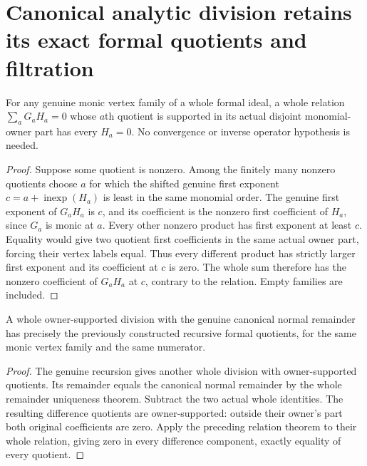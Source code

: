 \section{Canonical analytic division retains its exact formal quotients and filtration}

\begin{theorem}
\label{hir:actual-owner-supported-formal-relation-uniqueness}
\leanok
For any genuine monic vertex family of a whole formal ideal, a whole
relation $\sum_a G_aH_a=0$ whose $a$th quotient is supported in its actual
disjoint monomial-owner part has every $H_a=0$. No convergence or inverse
operator hypothesis is needed.
\end{theorem}
\begin{proof}
Suppose some quotient is nonzero. Among the finitely many nonzero
quotients choose $a$ for which the shifted genuine first exponent
$c=a+\operatorname{inexp}(H_a)$ is least in the same monomial order.
The genuine first exponent of $G_aH_a$ is $c$, and its coefficient is
the nonzero first coefficient of $H_a$, since $G_a$ is monic at $a$.
Every other nonzero product has first exponent at least $c$. Equality
would give two quotient first coefficients in the same actual owner
part, forcing their vertex labels equal. Thus every different product
has strictly larger first exponent and its coefficient at $c$ is zero.
The whole sum therefore has the nonzero coefficient of $G_aH_a$ at $c$,
contrary to the relation. Empty families are included.
\end{proof}

\begin{theorem}
\label{hir:actual-owner-division-formal-quotient-dictionary}
\leanok
A whole owner-supported division with the genuine canonical normal
remainder has precisely the previously constructed recursive formal
quotients, for the same monic vertex family and the same numerator.
\end{theorem}
\begin{proof}
The genuine recursion gives another whole division with owner-supported
quotients. Its remainder equals the canonical normal remainder by the
whole remainder uniqueness theorem. Subtract the two actual whole
identities. The resulting difference quotients are owner-supported:
outside their owner's part both original coefficients are zero. Apply
the preceding relation theorem to their whole relation, giving zero
in every difference component, exactly equality of every quotient.
\end{proof}


